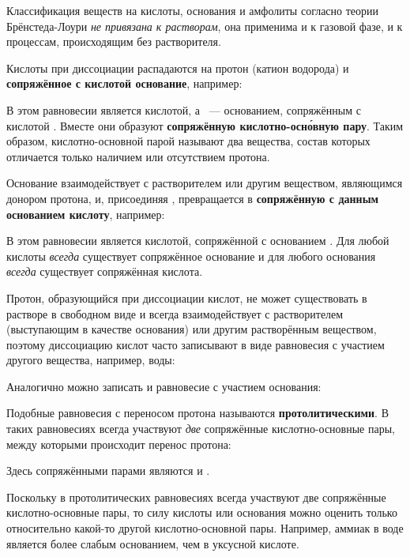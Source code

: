 Классификация веществ на кислоты, основания и амфолиты согласно теории Брёнстеда-Лоури \emph{не привязана к растворам}, она применима и к газовой фазе, и к процессам, происходящим без растворителя.

Кислоты при диссоциации распадаются на протон (катион водорода) и \textbf{сопряжённое с кислотой основание}, например:


В этом равновесии  является кислотой, а ~--- основанием, сопряжённым с кислотой . Вместе они образуют \textbf{сопряжённую кислотно-осн\'{о}вную пару}. Таким образом, кислотно-основной парой называют два вещества, состав которых отличается только наличием или отсутствием протона.

Основание взаимодействует с растворителем или другим веществом, являющимся донором протона, и, присоединяя , превращается в \textbf{сопряжённую с данным основанием кислоту}, например:


В этом равновесии  является кислотой, сопряжённой с основанием . Для любой кислоты \emph{всегда} существует сопряжённое основание и для любого основания \emph{всегда} существует сопряжённая кислота.

Протон, образующийся при диссоциации кислот, не может существовать в растворе в свободном виде и всегда взаимодействует с растворителем (выступающим в качестве основания) или другим растворённым веществом, поэтому диссоциацию кислот часто записывают в виде равновесия с участием другого вещества, например, воды:


Аналогично можно записать и равновесие с участием основания:


Подобные равновесия с переносом протона называются \textbf{протолитическими}. В таких равновесиях всегда участвуют \emph{две} сопряжённые кислотно-основные пары, между которыми происходит перенос протона:


Здесь сопряжёнными парами являются  и .

Поскольку в протолитических равновесиях всегда участвуют две сопряжённые кислотно-основные пары, то силу кислоты или основания можно оценить только относительно какой-то другой кислотно-основной пары. Например, аммиак в воде является более слабым основанием, чем в уксусной кислоте.

